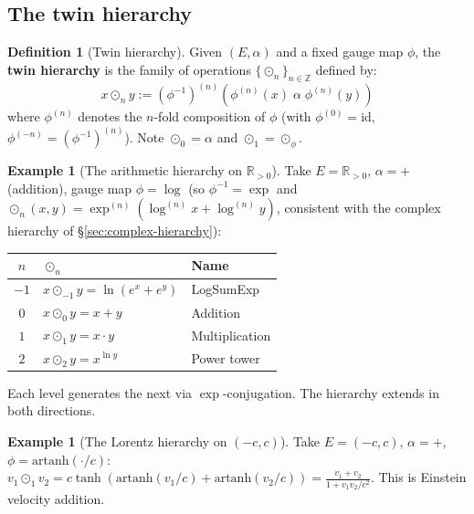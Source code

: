 \documentclass[12pt]{article}
\theoremstyle{plain}
\theoremstyle{definition}
\newtheorem{definition}[theorem]{Definition}
\newtheorem{example}[theorem]{Example}
\theoremstyle{remark}
\newcommand{\RR}{\mathbb{R}}
\newcommand{\ZZ}{\mathbb{Z}}
\begin{document}
\subsection{The twin hierarchy}

\begin{definition}[Twin hierarchy]\label{def:hierarchy}
Given $(E, \alpha)$ and a fixed gauge map $\phi$, the \textbf{twin hierarchy} is the family of operations $\{\odot_n\}_{n \in \ZZ}$ defined by:
\begin{equation}
x \odot_n y := (\phi^{-1})^{(n)}(\phi^{(n)}(x) \;\alpha\; \phi^{(n)}(y))
\end{equation}
where $\phi^{(n)}$ denotes the $n$-fold composition of $\phi$ (with $\phi^{(0)} = \mathrm{id}$, $\phi^{(-n)} = (\phi^{-1})^{(n)}$). Note $\odot_0 = \alpha$ and $\odot_1 = \odot_\phi$.
\end{definition}

\begin{example}[The arithmetic hierarchy on $\RR_{>0}$]\label{ex:arithmetic}
Take $E = \RR_{>0}$, $\alpha = +$ (addition), gauge map $\phi = \log$ (so $\phi^{-1} = \exp$ and $\odot_n(x,y) = \exp^{(n)}(\log^{(n)} x + \log^{(n)} y)$, consistent with the complex hierarchy of \S\ref{sec:complex-hierarchy}):
\begin{center}\small
\begin{tabular}{cll}\toprule
$n$ & $\odot_n$ & \textbf{Name} \\\midrule
$-1$ & $x \odot_{-1} y = \ln(e^x + e^y)$ & LogSumExp \\
$0$ & $x \odot_0 y = x + y$ & Addition \\
$1$ & $x \odot_1 y = x \cdot y$ & Multiplication \\
$2$ & $x \odot_2 y = x^{\ln y}$ & Power tower \\
\bottomrule
\end{tabular}
\end{center}
Each level generates the next via $\exp$-conjugation. The hierarchy extends in both directions.
\end{example}

\begin{example}[The Lorentz hierarchy on $(-c, c)$]\label{ex:lorentz}
Take $E = (-c, c)$, $\alpha = +$, $\phi = \mathrm{artanh}(\cdot/c)$:
$v_1 \odot_1 v_2 = c\tanh(\mathrm{artanh}(v_1/c) + \mathrm{artanh}(v_2/c)) = \frac{v_1 + v_2}{1 + v_1v_2/c^2}$.
This is Einstein velocity addition.
\end{example}


\end{document}
